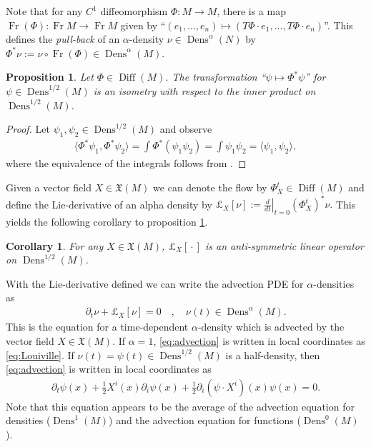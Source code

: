 \documentclass[a4paper, 12 pt]{amsart}
\newtheorem{prop}[thm]{Proposition}
\newtheorem{cor}[thm]{Corollary}
\DeclareMathOperator{\Diff}{Diff}
\DeclareMathOperator{\Fr}{Fr}
\DeclareMathOperator{\Dens}{Dens}
\begin{document}
  Note that for any $C^1$ diffeomorphism $\Phi:M \to M$,
  there is a map $\Fr(\Phi) : \Fr M \to \Fr M$
  given by 
  ``$(e_1,\dots,e_n) \mapsto (T\Phi \cdot e_1, \dots, T\Phi \cdot e_n)$''.
  This defines the \emph{pull-back} of an $\alpha$-density
  $\nu \in \Dens^\alpha(N)$
  by $\Phi^* \nu := \nu \circ \Fr(\Phi) \in \Dens^\alpha(M)$.
  \begin{prop} \label{prop:isom}
    Let $\Phi \in \Diff(M)$.
    The transformation ``$\psi \mapsto \Phi^* \psi$'' for
    $\psi \in \Dens^{1/2}(M)$ is an isometry with respect
    to the inner product on $\Dens^{1/2}(M)$.
  \end{prop}
  \begin{proof}
    Let $\psi_1,\psi_2 \in \Dens^{1/2}(M)$ and observe
    \begin{align*}
      \langle \Phi^* \psi_1, \Phi^* \psi_2 \rangle
      = \int \Phi^*( \psi_1 \psi_2)
      = \int \psi_1 \psi_2
      = \langle \psi_1, \psi_2 \rangle,
    \end{align*}
    where the equivalence of the integrals follows
    from \cite[Proposition 14.32(c)]{Lee2006}.
  \end{proof}
  
  Given a vector field $X \in \mathfrak{X}(M)$
  we can denote the flow by $\Phi^t_X \in \Diff(M)$
  and define the Lie-derivative of an alpha density by
  $
    \pounds_X[ \nu ] := \left. \frac{d}{dt} \right|_{t=0} (\Phi_X^t)^* \nu.
  $
  This yields the following corollary to proposition \ref{prop:isom}.
  \begin{cor}
    For any $X \in \mathfrak{X}(M)$, $\pounds_X[ {}\cdot{} ]$
    is an anti-symmetric linear operator on $\Dens^{1/2}(M)$.
  \end{cor}
  With the Lie-derivative defined we can write the advection
  PDE for $\alpha$-densities as
  \begin{align}
    \partial_t \nu + \pounds_X[\nu] = 0  \quad,\quad \nu(t) \in \Dens^\alpha(M) \label{eq:advection}.
  \end{align}
  This is the equation for a time-dependent $\alpha$-density which is advected by the vector field 
  $X \in \mathfrak{X}(M)$.
  If $\alpha = 1$, \eqref{eq:advection} is written in local coordinates
  as \eqref{eq:Louiville}.
  If $\nu(t) = \psi(t) \in \Dens^{1/2}(M)$ is a half-density, then
  \eqref{eq:advection} is written in local coordinates as
  \begin{align}
    \partial_t \psi(x) 
    + \frac{1}{2} X^i(x) \partial_i \psi(x) 
    + \frac{1}{2} \partial_i (\psi \cdot X^i)(x) \psi(x) = 0. \label{eq:local_half_density_advection}
  \end{align}
  Note that this equation appears to be the average of the advection equation for densities ($\Dens^1(M)$) and the advection equation for functions ($\Dens^0(M)$).
\end{document}
